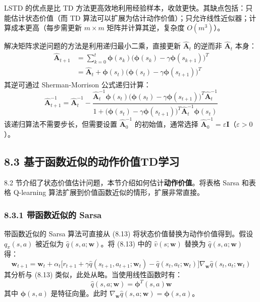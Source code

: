 \documentclass[UTF8]{article}
\begin{document}
LSTD 的优点是比 TD 方法更高效地利用经验样本，收敛更快。其缺点包括：只能估计状态价值（而 TD 算法可以扩展为估计动作价值）；只允许线性近似器；计算成本更高（每步需更新 $m \times m$ 矩阵并计算其逆，复杂度 $O(m^3)$）。

解决矩阵求逆问题的方法是利用递归最小二乘，直接更新 $\hat{\boldsymbol{A}}_t$ 的逆而非 $\hat{\boldsymbol{A}}_t$ 本身：
\[
\begin{aligned}
\hat{\boldsymbol{A}}_{t+1} &= \sum_{k=0}^{t} \boldsymbol{\phi}(s_k)\big(\boldsymbol{\phi}(s_k) - \gamma\boldsymbol{\phi}(s_{k+1})\big)^T \\
&= \hat{\boldsymbol{A}}_t + \boldsymbol{\phi}(s_t)\big(\boldsymbol{\phi}(s_t) - \gamma\boldsymbol{\phi}(s_{t+1})\big)^T
\end{aligned}
\]
其逆可通过 Sherman-Morrison 公式递归计算：
\[
\hat{\boldsymbol{A}}_{t+1}^{-1} = \hat{\boldsymbol{A}}_t^{-1} - \frac{\hat{\boldsymbol{A}}_t^{-1}\boldsymbol{\phi}(s_t)\big(\boldsymbol{\phi}(s_t) - \gamma\boldsymbol{\phi}(s_{t+1})\big)^T\hat{\boldsymbol{A}}_t^{-1}}{1 + \big(\boldsymbol{\phi}(s_t) - \gamma\boldsymbol{\phi}(s_{t+1})\big)^T\hat{\boldsymbol{A}}_t^{-1}\boldsymbol{\phi}(s_t)}
\]
该递归算法不需要步长，但需要设置 $\hat{\boldsymbol{A}}_0^{-1}$ 的初始值，通常选择 $\hat{\boldsymbol{A}}_0^{-1} = \varepsilon\boldsymbol{I}$（$\varepsilon > 0$）。

\subsection*{8.3 基于函数近似的动作价值TD学习}

8.2 节介绍了状态价值估计问题，本节介绍如何估计\textbf{动作价值}。将表格 Sarsa 和表格 Q-learning 算法扩展到价值函数近似的情形，扩展非常直接。

\subsubsection*{8.3.1 带函数近似的 Sarsa}

带函数近似的 Sarsa 算法可直接从 (8.13) 将状态价值替换为动作价值得到。假设 $q_\pi(s, a)$ 被近似为 $\hat{q}(s, a; \boldsymbol{w})$。将 (8.13) 中的 $\hat{v}(s; \boldsymbol{w})$ 替换为 $\hat{q}(s, a; \boldsymbol{w})$ 得：
\begin{equation}
\label{eq:sarsa_fa}
\boldsymbol{w}_{t+1} = \boldsymbol{w}_t + \alpha_t \big[r_{t+1} + \gamma \hat{q}(s_{t+1}, a_{t+1}; \boldsymbol{w}_t) - \hat{q}(s_t, a_t; \boldsymbol{w}_t)\big] \nabla_{\boldsymbol{w}} \hat{q}(s_t, a_t; \boldsymbol{w}_t)
\end{equation}
其分析与 (8.13) 类似，此处从略。当使用线性函数时有：
\[
\hat{q}(s, a; \boldsymbol{w}) = \boldsymbol{\phi}^T(s, a) \boldsymbol{w}
\]
其中 $\boldsymbol{\phi}(s, a)$ 是特征向量。此时 $\nabla_{\boldsymbol{w}} \hat{q}(s, a; \boldsymbol{w}) = \boldsymbol{\phi}(s, a)$。
\end{document}
